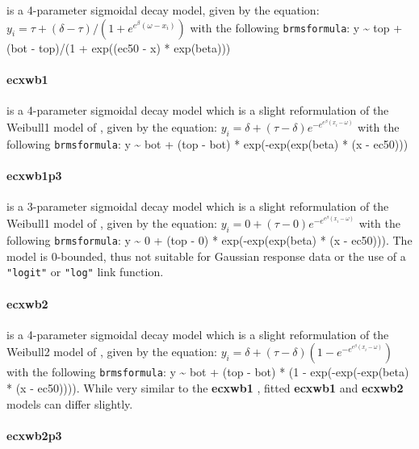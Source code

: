 \documentclass[
  shortnames]{jss}
\begin{document}
is a 4-parameter sigmoidal decay model, given by the equation:
\(y_i = \tau + (\delta - \tau)/(1 + e^{e^{\beta} (\omega - x_i)})\)
with the following \texttt{brmsformula}: y \textasciitilde{} top + (bot - top)/(1 + exp((ec50 - x) * exp(beta)))

\hypertarget{ecxwb1}{%
\paragraph{ecxwb1}\label{ecxwb1}}

is a 4-parameter sigmoidal decay model which is a slight reformulation of the Weibull1 model of \citet{Ritz2016}, given by the equation:
\(y_i = \delta + (\tau - \delta) e^{-e^{e^{\beta} (x_i - \omega)}}\)
with the following \texttt{brmsformula}: y \textasciitilde{} bot + (top - bot) * exp(-exp(exp(beta) * (x - ec50)))

\hypertarget{ecxwb1p3}{%
\paragraph{ecxwb1p3}\label{ecxwb1p3}}

is a 3-parameter sigmoidal decay model which is a slight reformulation of the Weibull1 model of \citet{Ritz2016}, given by the equation:
\(y_i = {0} + (\tau - {0}) e^{-e^{e^{\beta} (x_i - \omega)}}\)
with the following \texttt{brmsformula}: y \textasciitilde{} 0 + (top - 0) * exp(-exp(exp(beta) * (x - ec50))). The model is 0-bounded, thus not suitable for Gaussian response data or the use of a \texttt{"logit"} or \texttt{"log"} link function.

\hypertarget{ecxwb2}{%
\paragraph{ecxwb2}\label{ecxwb2}}

is a 4-parameter sigmoidal decay model which is a slight reformulation of the Weibull2 model of \citet{Ritz2016}, given by the equation:
\(y_i = \delta + (\tau - \delta) (1 - e^{-e^{e^{\beta} (x_i - \omega)}})\)
with the following \texttt{brmsformula}: y \textasciitilde{} bot + (top - bot) * (1 - exp(-exp(-exp(beta) * (x - ec50)))). While very similar to the \textbf{ecxwb1} \citep[according to][]{Ritz2016}, fitted \textbf{ecxwb1} and \textbf{ecxwb2} models can differ slightly.

\hypertarget{ecxwb2p3}{%
\paragraph{ecxwb2p3}\label{ecxwb2p3}}
\end{document}
